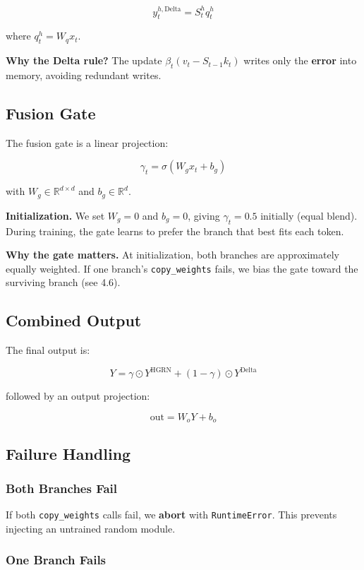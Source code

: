 \[
y_t^{h, \text{Delta}} = S_t^h q_t^h
\tag{4.5}
\]

where $q_t^h = W_q x_t$.

\textbf{Why the Delta rule?} The update $\beta_t (v_t - S_{t-1} k_t)$ writes only 
the \textbf{error} into memory, avoiding redundant writes.

\subsection{Fusion Gate}

The fusion gate is a linear projection:

\[
\gamma_t = \sigma(W_g x_t + b_g)
\tag{4.6}
\]

with $W_g \in \mathbb{R}^{d \times d}$ and $b_g \in \mathbb{R}^d$.

\textbf{Initialization.} We set $W_g = 0$ and $b_g = 0$, giving 
$\gamma_t = 0.5$ initially (equal blend). During training, the gate learns 
to prefer the branch that best fits each token.

\textbf{Why the gate matters.} At initialization, both branches are 
approximately equally weighted. If one branch's \texttt{copy\_weights} fails, we 
bias the gate toward the surviving branch (see  4.6).

\subsection{Combined Output}

The final output is:

\[
Y = \gamma \odot Y^\text{HGRN} + (1 - \gamma) \odot Y^\text{Delta}
\tag{4.7}
\]

followed by an output projection:

\[
\text{out} = W_o Y + b_o
\tag{4.8}
\]

\subsection{Failure Handling}

\subsubsection{Both Branches Fail}

If both \texttt{copy\_weights} calls fail, we \textbf{abort} with \texttt{RuntimeError}. This 
prevents injecting an untrained random module.

\subsubsection{One Branch Fails}

